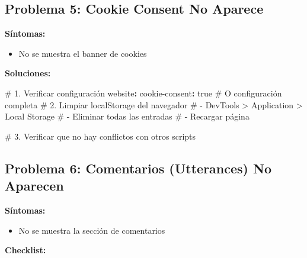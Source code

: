\documentclass[
  doc,
  floatsintext,
  longtable,
  a4paper,
  nolmodern,
  notxfonts,
  notimes,
  12pt,
  colorlinks=true,linkcolor=blue,citecolor=blue,urlcolor=blue]{apa7}
\newenvironment{Shaded}{\begin{snugshade}}{\end{snugshade}}
\newcommand{\AttributeTok}[1]{\textcolor[rgb]{0.40,0.45,0.13}{#1}}
\newcommand{\CharTok}[1]{\textcolor[rgb]{0.13,0.47,0.30}{#1}}
\newcommand{\CommentTok}[1]{\textcolor[rgb]{0.37,0.37,0.37}{#1}}
\newcommand{\FunctionTok}[1]{\textcolor[rgb]{0.28,0.35,0.67}{#1}}
\newcommand{\KeywordTok}[1]{\textcolor[rgb]{0.00,0.23,0.31}{\textbf{#1}}}
\providecommand{\tightlist}{%
  \setlength{\itemsep}{0pt}\setlength{\parskip}{0pt}}
\begin{document}
\subsection{Problema 5: Cookie Consent No
Aparece}\label{problema-5-cookie-consent-no-aparece}

\textbf{Síntomas:}

\begin{itemize}
\tightlist
\item
  No se muestra el banner de cookies
\end{itemize}

\textbf{Soluciones:}

\begin{Shaded}
\begin{Highlighting}[]
\CommentTok{\# 1. Verificar configuración}
\FunctionTok{website}\KeywordTok{:}
\AttributeTok{  }\FunctionTok{cookie{-}consent}\KeywordTok{:}\AttributeTok{ }\CharTok{true}\CommentTok{    \# O configuración completa}
\AttributeTok{  }
\CommentTok{\# 2. Limpiar localStorage del navegador}
\CommentTok{\# {-} DevTools \textgreater{} Application \textgreater{} Local Storage}
\CommentTok{\# {-} Eliminar todas las entradas}
\CommentTok{\# {-} Recargar página}

\CommentTok{\# 3. Verificar que no hay conflictos con otros scripts}
\end{Highlighting}
\end{Shaded}

\subsection{Problema 6: Comentarios (Utterances) No
Aparecen}\label{problema-6-comentarios-utterances-no-aparecen}

\textbf{Síntomas:}

\begin{itemize}
\tightlist
\item
  No se muestra la sección de comentarios
\end{itemize}

\textbf{Checklist:}
\end{document}
